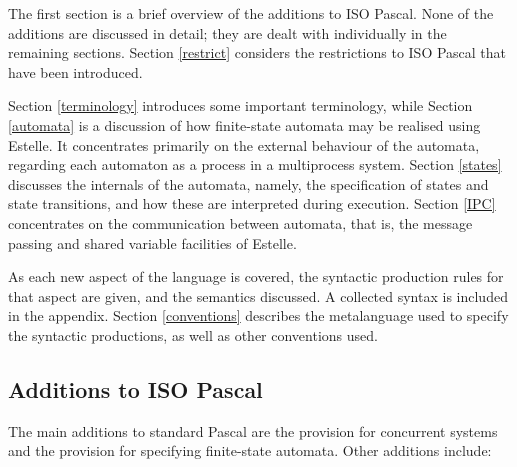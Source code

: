 The first section is a brief overview of the additions to
ISO Pascal. None of the additions are discussed in detail;
they are dealt with individually in the remaining sections.
Section \ref{restrict} considers the restrictions to ISO Pascal that
have been introduced.
 
Section \ref{terminology} introduces some important terminology, while
Section \ref{automata} is a discussion of how finite-state automata may
be realised using Estelle. It concentrates primarily on the
external behaviour of the automata, regarding each automaton
as a process in a multiprocess system. Section \ref{states}
discusses the internals of the automata, namely, the
specification of states and state transitions, and how these
are interpreted during execution. Section \ref{IPC} concentrates
on the communication between automata, that is, the message
passing and shared variable facilities of Estelle.
 
As each new aspect of the language is covered, the
syntactic production rules for that aspect are given, and
the semantics discussed. A collected syntax is included in
the appendix. Section \ref{conventions} describes the metalanguage used to
specify the syntactic productions, as well as other
conventions used.

\subsection[Additions to ISO Pascal]{Additions to ISO Pascal}

The main additions to standard Pascal are the provision
for concurrent systems and the provision for specifying
finite-state automata. Other additions include:

